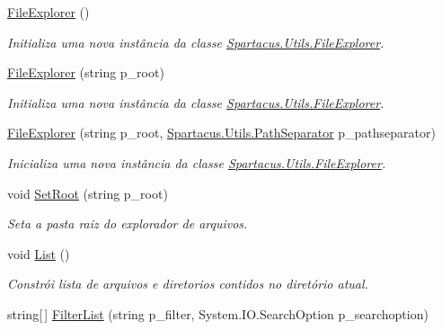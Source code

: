\begin{DoxyCompactItemize}
\item 
\hyperlink{classSpartacus_1_1Utils_1_1FileExplorer_a133727a338ccd4e44e9a32c0f89d9852}{File\+Explorer} ()
\begin{DoxyCompactList}\small\item\em Initializa uma nova instância da classe \hyperlink{classSpartacus_1_1Utils_1_1FileExplorer}{Spartacus.\+Utils.\+File\+Explorer}. \end{DoxyCompactList}\item 
\hyperlink{classSpartacus_1_1Utils_1_1FileExplorer_a37f733923b430db407d1459746d7fac7}{File\+Explorer} (string p\+\_\+root)
\begin{DoxyCompactList}\small\item\em Initializa uma nova instância da classe \hyperlink{classSpartacus_1_1Utils_1_1FileExplorer}{Spartacus.\+Utils.\+File\+Explorer}. \end{DoxyCompactList}\item 
\hyperlink{classSpartacus_1_1Utils_1_1FileExplorer_ac9adca2bd6d8767c21aa90a95efb087a}{File\+Explorer} (string p\+\_\+root, \hyperlink{namespaceSpartacus_1_1Utils_a9ee24558a33d60b42674bae3eed2a094}{Spartacus.\+Utils.\+Path\+Separator} p\+\_\+pathseparator)
\begin{DoxyCompactList}\small\item\em Inicializa uma nova instância da classe \hyperlink{classSpartacus_1_1Utils_1_1FileExplorer}{Spartacus.\+Utils.\+File\+Explorer}. \end{DoxyCompactList}\item 
void \hyperlink{classSpartacus_1_1Utils_1_1FileExplorer_a0b21899a7ac47d7a84d0558df390f388}{Set\+Root} (string p\+\_\+root)
\begin{DoxyCompactList}\small\item\em Seta a pasta raiz do explorador de arquivos. \end{DoxyCompactList}\item 
void \hyperlink{classSpartacus_1_1Utils_1_1FileExplorer_afc668f70066735934e76ed84c42b8d7e}{List} ()
\begin{DoxyCompactList}\small\item\em Constrói lista de arquivos e diretorios contidos no diretório atual. \end{DoxyCompactList}\item 
string\mbox{[}$\,$\mbox{]} \hyperlink{classSpartacus_1_1Utils_1_1FileExplorer_a1af76e64b4bb7ff7075179c881c08b71}{Filter\+List} (string p\+\_\+filter, System.\+I\+O.\+Search\+Option p\+\_\+searchoption)

\end{DoxyCompactItemize}
